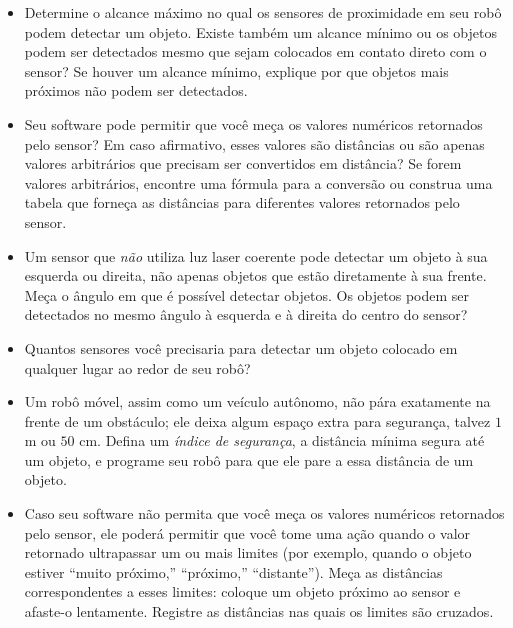 \begin{framed}

\begin{itemize}
\item Determine o alcance máximo no qual os sensores de proximidade em seu robô podem detectar um objeto. Existe também um alcance mínimo ou os objetos podem ser detectados mesmo que sejam colocados em contato direto com o sensor? Se houver um alcance mínimo, explique por que objetos mais próximos não podem ser detectados.
\item Seu software pode permitir que você meça os valores numéricos retornados pelo sensor? Em caso afirmativo, esses valores são distâncias ou são apenas valores arbitrários que precisam ser convertidos em distância? Se forem valores arbitrários, encontre uma fórmula para a conversão ou construa uma tabela que forneça as distâncias para diferentes valores retornados pelo sensor.
\item Um sensor que \emph{não} utiliza luz laser coerente pode detectar um objeto à sua esquerda ou direita, não apenas objetos que estão diretamente à sua frente. Meça o ângulo em que é possível detectar objetos. Os objetos podem ser detectados no mesmo ângulo à esquerda e à direita do centro do sensor?
\item Quantos sensores você precisaria para detectar um objeto colocado em qualquer lugar ao redor de seu robô?
\end{itemize}
\end{framed}

\begin{framed}

\begin{itemize}
\item Um robô móvel, assim como um veículo autônomo, não pára exatamente na frente de um obstáculo; ele deixa algum espaço extra para segurança, talvez $1$ m ou $50$ cm. Defina um \emph{índice de segurança}, a distância mínima segura até um objeto, e programe seu robô para que ele pare a essa distância de um objeto.
\item Caso seu software não permita que você meça os valores numéricos retornados pelo sensor, ele poderá permitir que você tome uma ação quando o valor retornado ultrapassar um ou mais limites (por exemplo, quando o objeto estiver ``muito próximo,'' ``próximo,'' ``distante''). Meça as distâncias correspondentes a esses limites: coloque um objeto próximo ao sensor e afaste-o lentamente. Registre as distâncias nas quais os limites são cruzados.
\end{itemize}
\end{framed}

